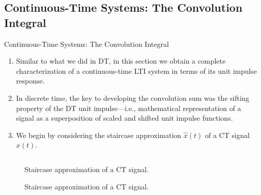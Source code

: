 \begin{frame}
\end{frame}



%
%


\subsection{Continuous-Time Systems: The Convolution Integral}

\begin{frame}{Continuous-Time Systems: The Convolution Integral}
    \begin{enumerate}
        \item Similar to what we did in DT, in this section we obtain a complete characterization of a continuous-time LTI system in terms of its unit impulse response.
        \item In discrete time, the key to developing the convolution sum was the sifting property of the DT unit impulse---i.e., mathematical representation of a signal as  a superposition of scaled and shifted unit impulse functions.
        \item We begin by considering the staircase approximation $\hat{x}(t)$ of a CT signal $x(t)$.
    \end{enumerate}

    {
        \begin{columns}
        \end{columns}
    }
\end{frame}

\begin{frame}[plain,t]
    {
    \begin{figure}
      \centering
      
      \caption{Staircase approximation of a CT signal.}\label{fi:ct_sifting}
    \end{figure}
    }
    {
    \begin{figure}
      \centering
      
      \caption{Staircase approximation of a CT signal.}\label{fi:ct_sifting_handout}
    \end{figure}
    }
\end{frame}



